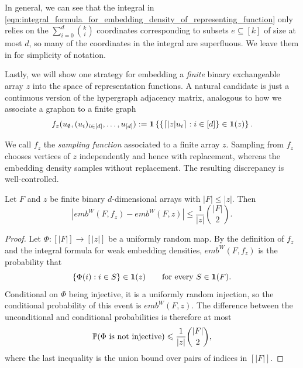In general, we can see that the integral in
\eqref{eqn:integral_formula_for_embedding_density_of_representing_function} only relies
on the $\sum_{i=0}^d \binom{k}{i}$ coordinates corresponding to subsets $e \subseteq [k]$ of size at most $d$,
so many of the coordinates in the integral are superfluous. We leave them in for simplicity of notation.

Lastly, we will show one strategy for embedding a \textit{finite} binary
exchangeable array $z$ into the space of representation functions. A natural candidate
 is just a continuous version of the hypergraph adjacency matrix,
 analogous to how we associate a graphon to a finite graph
    \begin{equation}
        f_z(u_\emptyset, (u_i)_{i \in [d]}, \ldots, u_{[d]})
        := \ind \left\{\{\lceil |z|u_i\rceil:i\in[d]\} \in \ind(z) \right\}.
        \label{eqn:ex_array_sampling_function}
    \end{equation}

\noindent We call $f_z$ the \textit{sampling function} associated to a finite array
$z$. Sampling from $f_z$ chooses vertices of $z$ independently and hence with
replacement, whereas the embedding density samples without replacement. The
resulting discrepancy is well-controlled.

\begin{lemma}\label{lem:sampling_functions_approximate_embedding_densities}
    Let $F$ and $z$ be finite binary $d$-dimensional arrays with
    $|F|\leq |z|$. Then
    \[
        \left|emb^W(F,f_z)-emb^W(F,z)\right|
        \leq \frac{1}{|z|}\binom{|F|}{2}.
    \]
\end{lemma}

\begin{proof}
Let $\Phi:[|F|]\to[|z|]$ be a uniformly random map. By the definition of
$f_z$ and the integral formula for weak embedding densities,
$emb^W(F,f_z)$ is the probability that
\[
    \{\Phi(i):i\in S\}\in\ind(z)
    \qquad\text{for every }S\in\ind(F).
\]
Conditional on $\Phi$ being injective, it is a uniformly random injection, so
the conditional probability of this event is $emb^W(F,z)$. The difference
between the unconditional and conditional probabilities is therefore at most
\[
    \P(\Phi\text{ is not injective})
    \leq \frac{1}{|z|}\binom{|F|}{2},
\]
where the last inequality is the union bound over pairs of indices in $[|F|]$.
\end{proof}



